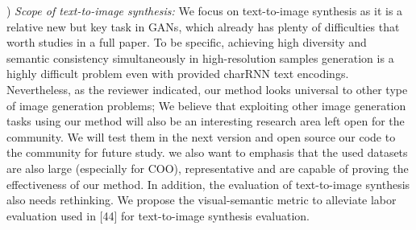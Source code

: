 \documentclass[10pt,twocolumn,letterpaper]{article}
\begin{document}
) \textit{Scope of text-to-image synthesis:} 
We focus on text-to-image synthesis as it is a relative new but key task in GANs, which already has plenty of difficulties that worth studies in a full paper. To be specific, achieving high diversity and semantic consistency simultaneously in high-resolution samples generation is a highly difficult problem even with provided charRNN text encodings. %
Nevertheless, as the reviewer indicated, our method looks universal to other type of image generation problems; We believe that exploiting other image generation tasks using our method will also be an interesting research area left open for the community. We will test them in the next version and open source our code to the community for future study.
we also want to emphasis that the used datasets are also large (especially for COO), representative and are capable of proving the effectiveness of our method.  In addition, the evaluation of text-to-image synthesis also needs rethinking. We propose the visual-semantic metric to alleviate labor evaluation used in [44] for  text-to-image synthesis evaluation.


\end{document}
